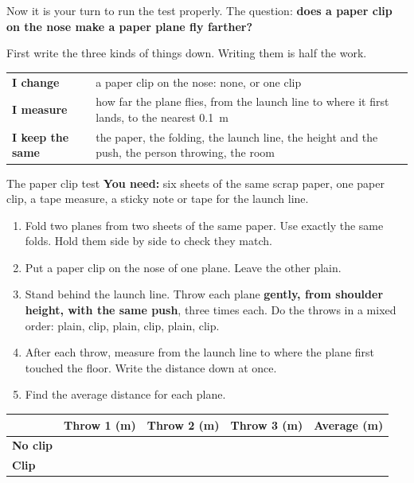 \label{ch2}

Now it is your turn to run the test properly. The question: \textbf{does a paper clip on the nose make a paper plane fly farther?}

First write the three kinds of things down. Writing them is half the work.

\begin{center}
\sffamily\small\renewcommand{\arraystretch}{1.5}
\begin{tabular}{@{}p{3.4cm}p{7.6cm}@{}}
\toprule
\textbf{I change} & a paper clip on the nose: none, or one clip\\
\textbf{I measure} & how far the plane flies, from the launch line to where it first lands, to the nearest 0.1~m\\
\textbf{I keep the same} & the paper, the folding, the launch line, the height and the push, the person throwing, the room\\
\bottomrule
\end{tabular}
\end{center}

\begin{tryit}{The paper clip test}
\textbf{You need:} six sheets of the same scrap paper, one paper clip, a tape measure, a sticky note or tape for the launch line.
\begin{enumerate}[leftmargin=1.6em]
\item Fold two planes from two sheets of the same paper. Use exactly the same folds. Hold them side by side to check they match.
\item Put a paper clip on the nose of one plane. Leave the other plain.
\item Stand behind the launch line. Throw each plane \textbf{gently, from shoulder height, with the same push}, three times each. Do the throws in a mixed order: plain, clip, plain, clip, plain, clip.
\item After each throw, measure from the launch line to where the plane first touched the floor. Write the distance down at once.
\item Find the average distance for each plane.
\end{enumerate}
\par\medskip
\renewcommand{\arraystretch}{1.6}
\begin{tabular}{|l|c|c|c|c|}
\hline
 & \textbf{Throw 1 (m)} & \textbf{Throw 2 (m)} & \textbf{Throw 3 (m)} & \textbf{Average (m)}\\ \hline
\textbf{No clip} & & & & \\ \hline
\textbf{Clip} & & & & \\ \hline
\end{tabular}
\end{tryit}

